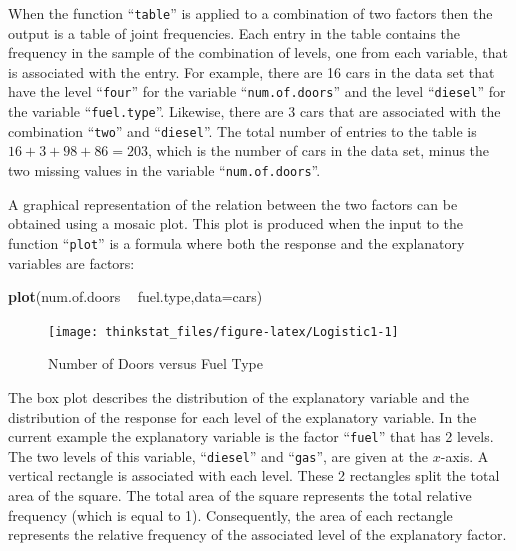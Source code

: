 \documentclass[]{krantz}
\makeatletter
\newenvironment{Shaded}{\begin{snugshade}}{\end{snugshade}}
\newcommand{\KeywordTok}[1]{\textcolor[rgb]{0.13,0.29,0.53}{\textbf{#1}}}
\newcommand{\DataTypeTok}[1]{\textcolor[rgb]{0.13,0.29,0.53}{#1}}
\newcommand{\StringTok}[1]{\textcolor[rgb]{0.31,0.60,0.02}{#1}}
\newcommand{\OperatorTok}[1]{\textcolor[rgb]{0.81,0.36,0.00}{\textbf{#1}}}
\newcommand{\NormalTok}[1]{#1}
\newenvironment{kframe}{%
\medskip{}
\setlength{\fboxsep}{.8em}
 \def\at@end@of@kframe{}%
 \ifinner\ifhmode%
  \def\at@end@of@kframe{\end{minipage}}%
  \begin{minipage}{\columnwidth}%
 \fi\fi%
 \def\FrameCommand##1{\hskip\@totalleftmargin \hskip-\fboxsep
 \colorbox{shadecolor}{##1}\hskip-\fboxsep
     \hskip-\linewidth \hskip-\@totalleftmargin \hskip\columnwidth}%
 \MakeFramed {\advance\hsize-\width
   \@totalleftmargin\z@ \linewidth\hsize
   \@setminipage}}%
 {\par\unskip\endMakeFramed%
 \at@end@of@kframe}
\renewenvironment{Shaded}{\begin{kframe}}{\end{kframe}}
\theoremstyle{definition}
\theoremstyle{definition}
\theoremstyle{definition}
\theoremstyle{remark}
\makeatother
\begin{document}
When the function ``\texttt{table}'' is applied to a combination of two
factors then the output is a table of joint frequencies. Each entry in
the table contains the frequency in the sample of the combination of
levels, one from each variable, that is associated with the entry. For
example, there are 16 cars in the data set that have the level
``\texttt{four}'' for the variable ``\texttt{num.of.doors}'' and the
level ``\texttt{diesel}'' for the variable ``\texttt{fuel.type}''.
Likewise, there are 3 cars that are associated with the combination
``\texttt{two}'' and ``\texttt{diesel}''. The total number of entries to
the table is \(16 + 3 + 98 + 86 = 203\), which is the number of cars in
the data set, minus the two missing values in the variable
``\texttt{num.of.doors}''.

A graphical representation of the relation between the two factors can
be obtained using a mosaic plot. This plot is produced when the input to
the function ``\texttt{plot}'' is a formula where both the response and
the explanatory variables are factors:

\begin{Shaded}
\begin{Highlighting}[]
\KeywordTok{plot}\NormalTok{(num.of.doors }\OperatorTok{~}\StringTok{ }\NormalTok{fuel.type,}\DataTypeTok{data=}\NormalTok{cars)}
\end{Highlighting}
\end{Shaded}

\begin{figure}

{\centering \texttt{[image: thinkstat\_files/figure-latex/Logistic1-1]} 

}

\caption{Number of Doors versus Fuel Type}\label{fig:Logistic1}
\end{figure}

The box plot describes the distribution of the explanatory variable and
the distribution of the response for each level of the explanatory
variable. In the current example the explanatory variable is the factor
``\texttt{fuel}'' that has 2 levels. The two levels of this variable,
``\texttt{diesel}'' and ``\texttt{gas}'', are given at the \(x\)-axis. A
vertical rectangle is associated with each level. These 2 rectangles
split the total area of the square. The total area of the square
represents the total relative frequency (which is equal to 1).
Consequently, the area of each rectangle represents the relative
frequency of the associated level of the explanatory factor.
\end{document}
